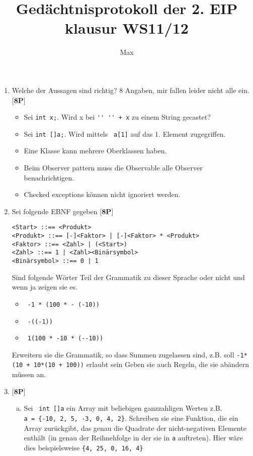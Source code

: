 \documentclass{article}
\begin{document}
\title{Gedächtnisprotokoll der 2. EIP klausur WS11/12}
\author{Max}
\maketitle
\begin{enumerate}
	\item Welche der Aussagen sind richtig? 8 Angaben, mir fallen leider nicht alle ein. \hfill \textbf{$[$8P$]$}
		\begin{itemize}
			\item Sei \verb|int x;|. Wird x bei \verb|'' '' + x| zu einem String gecastet?
			\item Sei \verb|int []a;|. Wird mittels  \verb| a[1]| auf das 1. Element zugegriffen.
			\item Eine Klasse kann mehrere Oberklassen haben.
			\item Beim Observer pattern muss die Observable alle Observer benachrichtigen.
			\item Checked exceptions können nicht ignoriert werden.
		\end{itemize}
	\item Sei folgende EBNF gegeben \hfill \textbf{$[$8P$]$}
		\begin{lstlisting}
<Start> ::== <Produkt>
<Produkt> ::== [-]<Faktor> | [-]<Faktor> * <Produkt>
<Faktor> ::== <Zahl> | (<Start>)
<Zahl> ::== 1 | <Zahl><Binärsymbol>
<Binärsymbol> ::== 0 | 1
		\end{lstlisting}
		Sind folgende Wörter Teil der Grammatik zu dieser Sprache oder nicht und wenn ja zeigen sie es.
		\begin{itemize}
			\item \verb| -1 * (100 * - (-10))|
			\item \verb| -((-1))|
			\item \verb| 1(100 * -10 * (--10))|
		\end{itemize}
		Erweitern sie die Grammatik, so dass Summen zugelassen sind, z.B. soll \verb|-1*(10 + 10*(10 + 100))| erlaubt sein
		Geben sie auch Regeln, die sie abändern müssen an.
	\item \hfill \textbf{$[$8P$]$}
		\begin{enumerate}[a)]
			\item  Sei \verb| int []a| ein Array mit beliebigen ganzzahligen Werten z.B. \\
				\verb|a = {-10, 2, 5, -3, 0, 4, 2}|. Schreiben sie eine Funktion, die ein Array zurückgibt, das genau die Quadrate der nicht-negativen Elemente enthält (in genau der Reihnehfolge in der sie in \verb|a| auftreten). Hier wäre dies beispielsweise \verb|{4, 25, 0, 16, 4}|

\end{enumerate}
\end{enumerate}
\end{document}
